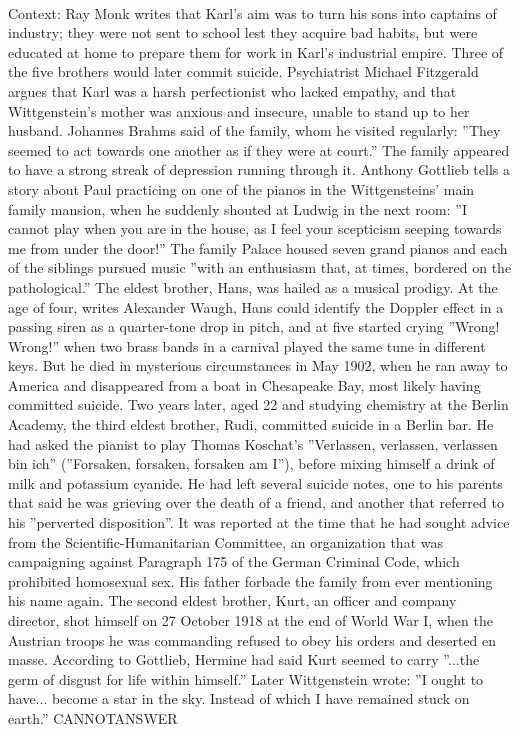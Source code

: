 \documentclass[11pt,a4paper, onecolumn]{article}
\begin{document}
\\ Context: Ray Monk writes that Karl's aim was to turn his sons into captains of industry; they were not sent to school lest they acquire bad habits, but were educated at home to prepare them for work in Karl's industrial empire. Three of the five brothers would later commit suicide. Psychiatrist Michael Fitzgerald argues that Karl was a harsh perfectionist who lacked empathy, and that Wittgenstein's mother was anxious and insecure, unable to stand up to her husband. Johannes Brahms said of the family, whom he visited regularly: ''They seemed to act towards one another as if they were at court.'' The family appeared to have a strong streak of depression running through it. Anthony Gottlieb tells a story about Paul practicing on one of the pianos in the Wittgensteins' main family mansion, when he suddenly shouted at Ludwig in the next room: ''I cannot play when you are in the house, as I feel your scepticism seeping towards me from under the door!'' The family Palace housed seven grand pianos and each of the siblings pursued music ''with an enthusiasm that, at times, bordered on the pathological.'' The eldest brother, Hans, was hailed as a musical prodigy. At the age of four, writes Alexander Waugh, Hans could identify the Doppler effect in a passing siren as a quarter-tone drop in pitch, and at five started crying ''Wrong! Wrong!'' when two brass bands in a carnival played the same tune in different keys. But he died in mysterious circumstances in May 1902, when he ran away to America and disappeared from a boat in Chesapeake Bay, most likely having committed suicide. Two years later, aged 22 and studying chemistry at the Berlin Academy, the third eldest brother, Rudi, committed suicide in a Berlin bar. He had asked the pianist to play Thomas Koschat's ''Verlassen, verlassen, verlassen bin ich'' (''Forsaken, forsaken, forsaken am I''), before mixing himself a drink of milk and potassium cyanide. He had left several suicide notes, one to his parents that said he was grieving over the death of a friend, and another that referred to his ''perverted disposition''. It was reported at the time that he had sought advice from the Scientific-Humanitarian Committee, an organization that was campaigning against Paragraph 175 of the German Criminal Code, which prohibited homosexual sex. His father forbade the family from ever mentioning his name again. The second eldest brother, Kurt, an officer and company director, shot himself on 27 October 1918 at the end of World War I, when the Austrian troops he was commanding refused to obey his orders and deserted en masse. According to Gottlieb, Hermine had said Kurt seemed to carry ''...the germ of disgust for life within himself.'' Later Wittgenstein wrote: ''I ought to have... become a star in the sky. Instead of which I have remained stuck on earth.'' CANNOTANSWER
\end{document}
